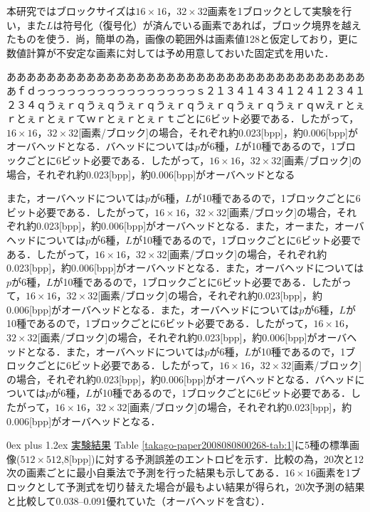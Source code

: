 \documentclass[9pt,dvipdfmx]{jsarticle}
\makeatletter
\def\section{\@startsection {section}{1}{\z@}
{1ex plus -1ex minus-.2ex}%
{0ex plus 1.2ex}%
 {\normalsize\bf}%
 }
\makeatother
\begin{document}
本研究ではブロックサイズは$16\times16$，$32\times32$画素を1ブロックとして実験を行い，また$L$は符号化（復号化）が済んでいる画素であれば，ブロック境界を越えたものを使う．尚，簡単の為，画像の範囲外は画素値128と仮定しており，更に数値計算が不安定な画素に対しては予め用意しておいた固定式を用いた．

あああああああああああああああああああああああああああああああああああああｆｄっっっっっっっっっっっっっっっっｓ２１３４１４３４１２４１２３４１２３４ｑうぇｒｑうぇｑうぇｒｑうぇｒｑうぇｒｑうぇｒｑうぇｒｑｗえｒとぇｒとぇｒとぇｒてｗｒとぇｒとぇｒｔごとに6ビット必要である．したがって，$16\times 16$，$32\times 32$[画素/ブロック]の場合，それぞれ約0.023[bpp]，約0.006[bpp]がオーバヘッドとなる．バヘッドについては$p$が6種，$L$が10種であるので，1ブロックごとに6ビット必要である．したがって，$16\times 16$，$32\times 32$[画素/ブロック]の場合，それぞれ約0.023[bpp]，約0.006[bpp]がオーバヘッドとなる

また，オーバヘッドについては$p$が6種，$L$が10種であるので，1ブロックごとに6ビット必要である．したがって，$16\times 16$，$32\times 32$[画素/ブロック]の場合，それぞれ約0.023[bpp]，約0.006[bpp]がオーバヘッドとなる．また，オーまた，オーバヘッドについては$p$が6種，$L$が10種であるので，1ブロックごとに6ビット必要である．したがって，$16\times 16$，$32\times 32$[画素/ブロック]の場合，それぞれ約0.023[bpp]，約0.006[bpp]がオーバヘッドとなる．また，オーバヘッドについては$p$が6種，$L$が10種であるので，1ブロックごとに6ビット必要である．したがって，$16\times 16$，$32\times 32$[画素/ブロック]の場合，それぞれ約0.023[bpp]，約0.006[bpp]がオーバヘッドとなる．また，オーバヘッドについては$p$が6種，$L$が10種であるので，1ブロックごとに6ビット必要である．したがって，$16\times 16$，$32\times 32$[画素/ブロック]の場合，それぞれ約0.023[bpp]，約0.006[bpp]がオーバヘッドとなる．また，オーバヘッドについては$p$が6種，$L$が10種であるので，1ブロックごとに6ビット必要である．したがって，$16\times 16$，$32\times 32$[画素/ブロック]の場合，それぞれ約0.023[bpp]，約0.006[bpp]がオーバヘッドとなる．バヘッドについては$p$が6種，$L$が10種であるので，1ブロックごとに6ビット必要である．したがって，$16\times 16$，$32\times 32$[画素/ブロック]の場合，それぞれ約0.023[bpp]，約0.006[bpp]がオーバヘッドとなる．

\section{\underline{実験結果}}
Table \ref{takago-paper2008080800268-tab:1}に5種の標準画像($512\times512$,8[bpp])に対する予測誤差のエントロピを示す．比較の為，20次と12次の画素ごとに最小自乗法で予測を行った結果も示してある．$16\times 16$画素を1ブロックとして予測式を切り替えた場合が最もよい結果が得られ，20次予測の結果と比較して0.038--0.091優れていた（オーバヘッドを含む）．
\end{document}
